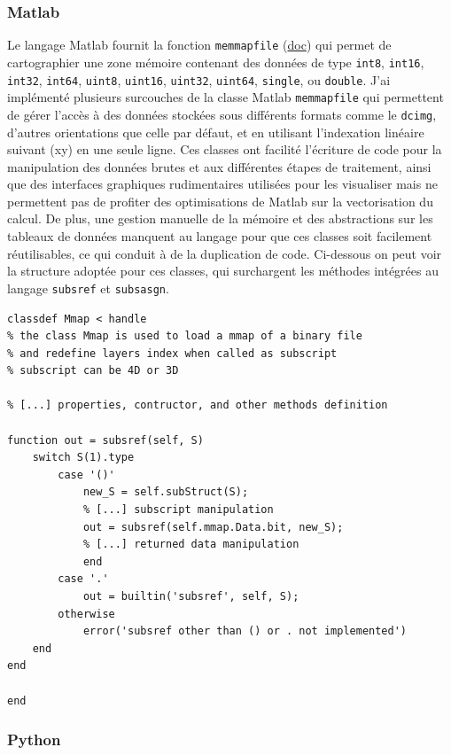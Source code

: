 \subsubsection{Matlab}

Le langage Matlab fournit la fonction \verb|memmapfile| (\href{https://fr.mathworks.com/help/matlab/ref/memmapfile.html}{doc}) qui permet de cartographier une zone mémoire contenant des données de type \verb|int8|, \verb|int16|, \verb|int32|, \verb|int64|, \verb|uint8|, \verb|uint16|, \verb|uint32|, \verb|uint64|, \verb|single|, ou \verb|double|.
J'ai implémenté plusieurs surcouches de la classe Matlab \verb|memmapfile| qui permettent de gérer l'accès à des données stockées sous différents formats comme le \verb|dcimg|, d'autres orientations que celle par défaut, et en utilisant l'indexation linéaire suivant (xy) en une seule ligne. Ces classes ont facilité l'écriture de code pour la manipulation des données brutes et aux différentes étapes de traitement, ainsi que des interfaces graphiques rudimentaires utilisées pour les visualiser mais ne permettent pas de profiter des optimisations de Matlab sur la vectorisation du calcul.
De plus, une gestion manuelle de la mémoire et des abstractions sur les tableaux de données manquent au langage pour que ces classes soit facilement réutilisables, ce qui conduit à de la duplication de code. Ci-dessous on peut voir la structure adoptée pour ces classes, qui surchargent les méthodes intégrées au langage \verb|subsref| et \verb|subsasgn|.


\matlabstyle
\begin{lstlisting}
classdef Mmap < handle
% the class Mmap is used to load a mmap of a binary file
% and redefine layers index when called as subscript
% subscript can be 4D or 3D

% [...] properties, contructor, and other methods definition

function out = subsref(self, S)        
    switch S(1).type
        case '()'
            new_S = self.subStruct(S);
            % [...] subscript manipulation
            out = subsref(self.mmap.Data.bit, new_S);
            % [...] returned data manipulation
            end
        case '.'
            out = builtin('subsref', self, S);
        otherwise
            error('subsref other than () or . not implemented')
    end        
end

end
\end{lstlisting}

\subsubsection{Python}

